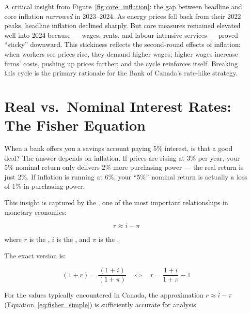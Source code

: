 A critical insight from Figure~\ref{fig:core_inflation}: the gap between
headline and core inflation \textit{narrowed} in 2023--2024. As energy prices
fell back from their 2022 peaks, headline inflation declined sharply. But
core measures remained elevated well into 2024 because  --- wages, rents, and labour-intensive services --- proved
``sticky'' downward. This stickiness reflects the second-round effects of
inflation: when workers see prices rise, they demand higher wages; higher
wages increase firms' costs, pushing up prices further; and the cycle
reinforces itself. Breaking this cycle is the primary rationale for the
Bank of Canada's rate-hike strategy.

\section{Real vs.\ Nominal Interest Rates: The Fisher Equation}
\label{sec:fisher_equation}

When a bank offers you a savings account paying 5\% interest, is that a good
deal? The answer depends on inflation. If prices are rising at 3\% per year,
your 5\% nominal return only delivers 2\% more purchasing power --- the
real return is just 2\%. If inflation is running at 6\%, your ``5\%'' nominal
return is actually a loss of 1\% in purchasing power.

This insight is captured by the , one of the most
important relationships in monetary economics:

\begin{equation}
  r \approx i - \pi
  \label{eq:fisher_simple}
\end{equation}

\noindent where $r$ is the , $i$ is the
, and $\pi$ is the .

The exact version is:

\begin{equation}
  (1 + r) = \frac{(1 + i)}{(1 + \pi)}
  \quad \Longleftrightarrow \quad
  r = \frac{1 + i}{1 + \pi} - 1
  \label{eq:fisher_exact}
\end{equation}

For the values typically encountered in Canada, the approximation
$r \approx i - \pi$ (Equation~\ref{eq:fisher_simple}) is sufficiently
accurate for analysis.

